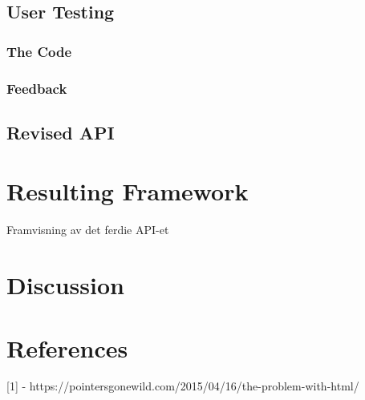 \documentclass[12pt]{article}
\begin{document}
    \subsection{User Testing}

        \subsubsection{The Code}

        \subsubsection{Feedback}

    \subsection{Revised API}

\section{Resulting Framework}
Framvisning av det ferdie API-et

\section{Discussion}

\section{References}
[1] - https://pointersgonewild.com/2015/04/16/the-problem-with-html/
\end{document}
